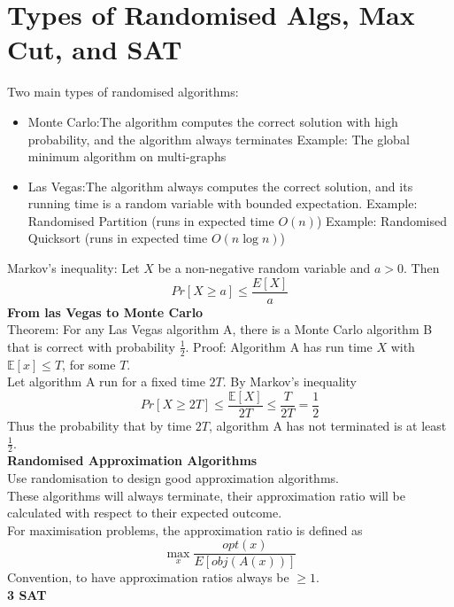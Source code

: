 \documentclass[onecolumn]{report}
\begin{document}
\section{Types of Randomised Algs, Max Cut, and SAT}
Two main types of randomised algorithms:
\begin{itemize}
    \item Monte Carlo:The algorithm computes the correct solution with high probability, and the algorithm always terminates
    \subitem Example: The global minimum algorithm on multi-graphs
    \item Las Vegas:The algorithm always computes the correct solution, and its running time is a random variable with bounded expectation.
    \subitem Example: Randomised Partition (runs in expected time $O(n)$)
    \subitem Example: Randomised Quicksort (runs in expected time $O(n \log n)$)
\end{itemize}
Markov's inequality: Let $X$ be a non-negative random variable and $a>0$. Then
\begin{equation*}
    Pr[X \geq a] \leq \frac{E[X]}{a}
\end{equation*}
\textbf{From las Vegas to Monte Carlo}\\
Theorem: For any Las Vegas algorithm A, there is a Monte Carlo algorithm B that is correct with probability $\frac{1}{2}$.
Proof: Algorithm A has run time $X$ with $\mathbb{E} [x] \leq T$, for some $T$.\\
Let algorithm A run for a fixed time $2T$. By Markov's inequality
\begin{equation*}
    Pr[X \geq 2T] \leq \frac{\mathbb{E}[X]}{2T} \leq \frac{T}{2T} = \frac{1}{2}
\end{equation*}
Thus the probability that by time $2T$, algorithm A has not terminated is at least $\frac{1}{2}$.\\
\textbf{Randomised Approximation Algorithms}\\
Use randomisation to design good approximation algorithms.\\
These algorithms will always terminate, their approximation ratio will be calculated with respect to their expected outcome.\\
For maximisation problems, the approximation ratio is defined as
\begin{equation*}
    \max_x \frac{opt(x)}{E[obj(A(x))]}
\end{equation*}
Convention, to have approximation ratios always be $\geq 1$.\\
\textbf{3 SAT}\\
\end{document}
